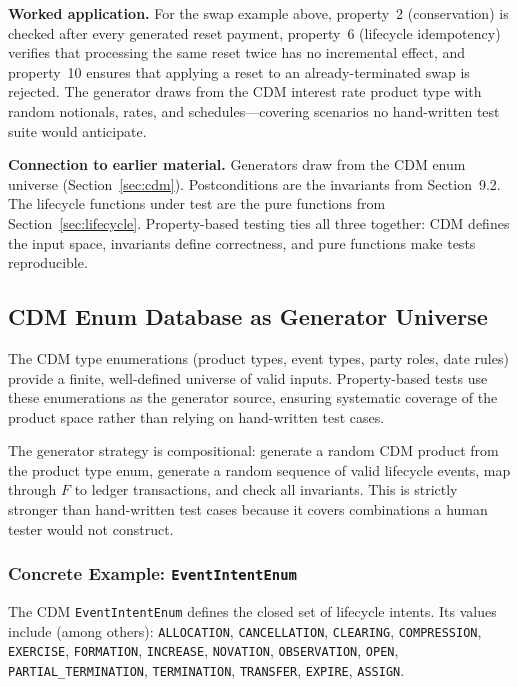 \documentclass[11pt,a4paper]{article}
\begin{document}
\noindent\textbf{Worked application.} For the swap example above, property~2 (conservation) is checked after every generated reset payment, property~6 (lifecycle idempotency) verifies that processing the same reset twice has no incremental effect, and property~10 ensures that applying a reset to an already-terminated swap is rejected. The generator draws from the CDM interest rate product type with random notionals, rates, and schedules---covering scenarios no hand-written test suite would anticipate.

\noindent\textbf{Connection to earlier material.} Generators draw from the CDM enum universe (Section~\ref{sec:cdm}). Postconditions are the invariants from Section~9.2. The lifecycle functions under test are the pure functions from Section~\ref{sec:lifecycle}. Property-based testing ties all three together: CDM defines the input space, invariants define correctness, and pure functions make tests reproducible.

\subsection{CDM Enum Database as Generator Universe}

The CDM type enumerations (product types, event types, party roles, date rules) provide a finite, well-defined universe of valid inputs. Property-based tests use these enumerations as the generator source, ensuring systematic coverage of the product space rather than relying on hand-written test cases.

The generator strategy is compositional: generate a random CDM product from the product type enum, generate a random sequence of valid lifecycle events, map through $F$ to ledger transactions, and check all invariants. This is strictly stronger than hand-written test cases because it covers combinations a human tester would not construct.

\subsubsection{Concrete Example: \texttt{EventIntentEnum}}

The CDM \texttt{EventIntentEnum} defines the closed set of lifecycle intents. Its values include (among others): \texttt{ALLOCATION}, \texttt{CANCELLATION}, \texttt{CLEARING}, \texttt{COMPRESSION}, \texttt{EXERCISE}, \texttt{FORMATION}, \texttt{INCREASE}, \texttt{NOVATION}, \texttt{OBSERVATION}, \texttt{OPEN}, \texttt{PARTIAL\_TERMINATION}, \texttt{TERMINATION}, \texttt{TRANSFER}, \texttt{EXPIRE}, \texttt{ASSIGN}.
\end{document}
